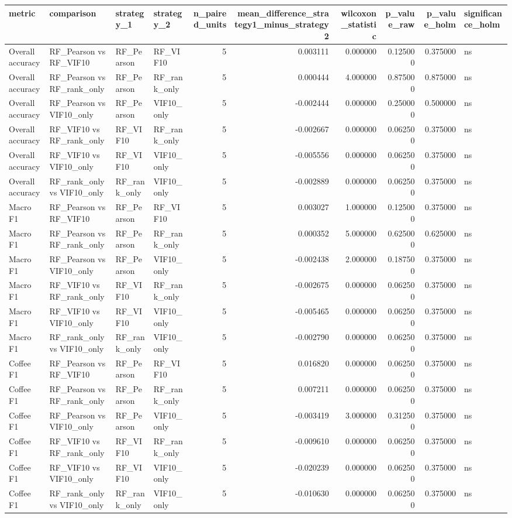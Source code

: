 \begin{tabular}{llllrrrrrl}
\toprule
metric & comparison & strategy_1 & strategy_2 & n_paired_units & mean_difference_strategy1_minus_strategy2 & wilcoxon_statistic & p_value_raw & p_value_holm & significance_holm \\
\midrule
Overall accuracy & RF_Pearson vs RF_VIF10 & RF_Pearson & RF_VIF10 & 5 & 0.003111 & 0.000000 & 0.125000 & 0.375000 & ns \\
Overall accuracy & RF_Pearson vs RF_rank_only & RF_Pearson & RF_rank_only & 5 & 0.000444 & 4.000000 & 0.875000 & 0.875000 & ns \\
Overall accuracy & RF_Pearson vs VIF10_only & RF_Pearson & VIF10_only & 5 & -0.002444 & 0.000000 & 0.250000 & 0.500000 & ns \\
Overall accuracy & RF_VIF10 vs RF_rank_only & RF_VIF10 & RF_rank_only & 5 & -0.002667 & 0.000000 & 0.062500 & 0.375000 & ns \\
Overall accuracy & RF_VIF10 vs VIF10_only & RF_VIF10 & VIF10_only & 5 & -0.005556 & 0.000000 & 0.062500 & 0.375000 & ns \\
Overall accuracy & RF_rank_only vs VIF10_only & RF_rank_only & VIF10_only & 5 & -0.002889 & 0.000000 & 0.062500 & 0.375000 & ns \\
Macro F1 & RF_Pearson vs RF_VIF10 & RF_Pearson & RF_VIF10 & 5 & 0.003027 & 1.000000 & 0.125000 & 0.375000 & ns \\
Macro F1 & RF_Pearson vs RF_rank_only & RF_Pearson & RF_rank_only & 5 & 0.000352 & 5.000000 & 0.625000 & 0.625000 & ns \\
Macro F1 & RF_Pearson vs VIF10_only & RF_Pearson & VIF10_only & 5 & -0.002438 & 2.000000 & 0.187500 & 0.375000 & ns \\
Macro F1 & RF_VIF10 vs RF_rank_only & RF_VIF10 & RF_rank_only & 5 & -0.002675 & 0.000000 & 0.062500 & 0.375000 & ns \\
Macro F1 & RF_VIF10 vs VIF10_only & RF_VIF10 & VIF10_only & 5 & -0.005465 & 0.000000 & 0.062500 & 0.375000 & ns \\
Macro F1 & RF_rank_only vs VIF10_only & RF_rank_only & VIF10_only & 5 & -0.002790 & 0.000000 & 0.062500 & 0.375000 & ns \\
Coffee F1 & RF_Pearson vs RF_VIF10 & RF_Pearson & RF_VIF10 & 5 & 0.016820 & 0.000000 & 0.062500 & 0.375000 & ns \\
Coffee F1 & RF_Pearson vs RF_rank_only & RF_Pearson & RF_rank_only & 5 & 0.007211 & 0.000000 & 0.062500 & 0.375000 & ns \\
Coffee F1 & RF_Pearson vs VIF10_only & RF_Pearson & VIF10_only & 5 & -0.003419 & 3.000000 & 0.312500 & 0.375000 & ns \\
Coffee F1 & RF_VIF10 vs RF_rank_only & RF_VIF10 & RF_rank_only & 5 & -0.009610 & 0.000000 & 0.062500 & 0.375000 & ns \\
Coffee F1 & RF_VIF10 vs VIF10_only & RF_VIF10 & VIF10_only & 5 & -0.020239 & 0.000000 & 0.062500 & 0.375000 & ns \\
Coffee F1 & RF_rank_only vs VIF10_only & RF_rank_only & VIF10_only & 5 & -0.010630 & 0.000000 & 0.062500 & 0.375000 & ns \\
\bottomrule
\end{tabular}
